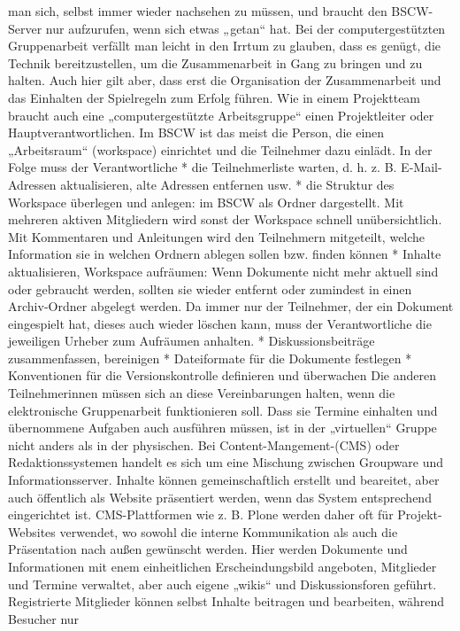 \documentclass[]{book}
\theoremstyle{definition}
\theoremstyle{definition}
\theoremstyle{definition}
\theoremstyle{remark}
\begin{document}
man sich, selbst immer wieder nachsehen zu müssen, und braucht den
BSCW-Server nur aufzurufen, wenn sich etwas „getan`` hat. Bei der
computergestützten Gruppenarbeit verfällt man leicht in den Irrtum zu
glauben, dass es genügt, die Technik bereitzustellen, um die
Zusammenarbeit in Gang zu bringen und zu halten. Auch hier gilt aber,
dass erst die Organisation der Zusammenarbeit und das Einhalten der
Spielregeln zum Erfolg führen. Wie in einem Projektteam braucht auch
eine „computergestützte Arbeitsgruppe`` einen Projektleiter oder
Hauptverantwortlichen. Im BSCW ist das meist die Person, die einen
„Arbeitsraum`` (workspace) einrichtet und die Teilnehmer dazu einlädt.
In der Folge muss der Verantwortliche * die Teilnehmerliste warten, d.
h. z. B. E-Mail-Adressen aktualisieren, alte Adressen entfernen usw. *
die Struktur des Workspace überlegen und anlegen: im BSCW als Ordner
dargestellt. Mit mehreren aktiven Mitgliedern wird sonst der Workspace
schnell unübersichtlich. Mit Kommentaren und Anleitungen wird den
Teilnehmern mitgeteilt, welche Information sie in welchen Ordnern
ablegen sollen bzw. finden können * Inhalte aktualisieren, Workspace
aufräumen: Wenn Dokumente nicht mehr aktuell sind oder gebraucht werden,
sollten sie wieder entfernt oder zumindest in einen Archiv-Ordner
abgelegt werden. Da immer nur der Teilnehmer, der ein Dokument
eingespielt hat, dieses auch wieder löschen kann, muss der
Verantwortliche die jeweiligen Urheber zum Aufräumen anhalten. *
Diskussionsbeiträge zusammenfassen, bereinigen * Dateiformate für die
Dokumente festlegen * Konventionen für die Versionskontrolle definieren
und überwachen Die anderen Teilnehmerinnen müssen sich an diese
Vereinbarungen halten, wenn die elektronische Gruppenarbeit
funktionieren soll. Dass sie Termine einhalten und übernommene Aufgaben
auch ausführen müssen, ist in der „virtuellen`` Gruppe nicht anders als
in der physischen. Bei Content-Mangement-(CMS) oder Redaktionssystemen
handelt es sich um eine Mischung zwischen Groupware und
Informationsserver. Inhalte können gemeinschaftlich erstellt und
beareitet, aber auch öffentlich als Website präsentiert werden, wenn das
System entsprechend eingerichtet ist. CMS-Plattformen wie z. B. Plone
werden daher oft für Projekt-Websites verwendet, wo sowohl die interne
Kommunikation als auch die Präsentation nach außen gewünscht werden.
Hier werden Dokumente und Informationen mit enem einheitlichen
Erscheindungsbild angeboten, Mitglieder und Termine verwaltet, aber auch
eigene „wikis`` und Diskussionsforen geführt. Registrierte Mitglieder
können selbst Inhalte beitragen und bearbeiten, während Besucher nur
\end{document}
